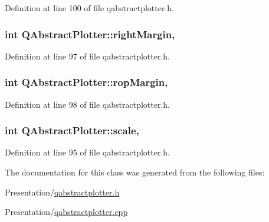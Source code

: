 Definition at line 100 of file qabstractplotter.\+h.

\hypertarget{class_q_abstract_plotter_abad2dc2209000f2b19ac7a25dfd1cfb7}{}
\subsubsection[{right\+Margin}]{\setlength{\rightskip}{0pt plus 5cm}int Q\+Abstract\+Plotter\+::right\+Margin\hspace{0.3cm}{\ttfamily [read]}, {\ttfamily [write]}}\label{class_q_abstract_plotter_abad2dc2209000f2b19ac7a25dfd1cfb7}


Definition at line 97 of file qabstractplotter.\+h.

\hypertarget{class_q_abstract_plotter_ae56e010438b633a7cdf33eb209119f2c}{}
\subsubsection[{rop\+Margin}]{\setlength{\rightskip}{0pt plus 5cm}int Q\+Abstract\+Plotter\+::rop\+Margin\hspace{0.3cm}{\ttfamily [read]}, {\ttfamily [write]}}\label{class_q_abstract_plotter_ae56e010438b633a7cdf33eb209119f2c}


Definition at line 98 of file qabstractplotter.\+h.

\hypertarget{class_q_abstract_plotter_aa01fe966220b24f5d63de9fa46e7b53d}{}
\subsubsection[{scale}]{\setlength{\rightskip}{0pt plus 5cm}int Q\+Abstract\+Plotter\+::scale\hspace{0.3cm}{\ttfamily [read]}, {\ttfamily [write]}}\label{class_q_abstract_plotter_aa01fe966220b24f5d63de9fa46e7b53d}


Definition at line 95 of file qabstractplotter.\+h.



The documentation for this class was generated from the following files\+:\begin{DoxyCompactItemize}
\item 
Presentation/\hyperlink{qabstractplotter_8h}{qabstractplotter.\+h}\item 
Presentation/\hyperlink{qabstractplotter_8cpp}{qabstractplotter.\+cpp}\end{DoxyCompactItemize}
